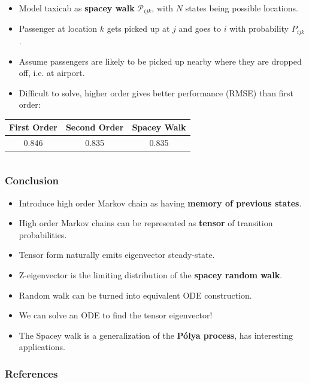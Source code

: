 \documentclass{beamer}
\begin{document}
\begin{frame}
\begin{columns}
		\begin{column}{0.7\linewidth}
		\begin{itemize}
			\item Model taxicab as \textbf{spacey walk} $\mathcal{P}_{ijk}$, with $N$ states being possible locations.
			\item Passenger at location $k$ gets picked up at $j$ and goes to $i$ with probability $P_{ijk}$.
			\item Assume passengers are likely to be picked up nearby where they are dropped off, i.e. at airport.
			\item Difficult to solve, higher order gives better performance (RMSE) than first order:
		\end{itemize}
		\begin{tabular}{|ccc|}
			\hline
			First Order & Second Order & Spacey Walk \\
			\hline
			0.846 & 0.835 & 0.835 \\
			\hline
		\end{tabular}
		\end{column}
	\end{columns}
\end{frame}

\begin{frame}
	\frametitle{Conclusion}
	\begin{itemize}
		\item Introduce high order Markov chain as having \textbf{memory of previous states}.
		\item High order Markov chains can be represented as \textbf{tensor} of transition probabilities.
		\item Tensor form naturally emits eigenvector steady-state.
		\item Z-eigenvector is the limiting distribution of the \textbf{spacey random walk}.
		\item Random walk can be turned into equivalent ODE construction.
		\item We can solve an ODE to find the tensor eigenvector!
		\item The Spacey walk is a generalization of the \textbf{P\'{o}lya process}, has interesting applications.
	\end{itemize}
\end{frame}


\begin{frame}
\frametitle{References}
\nocite*{}


\end{frame}
\end{document}
